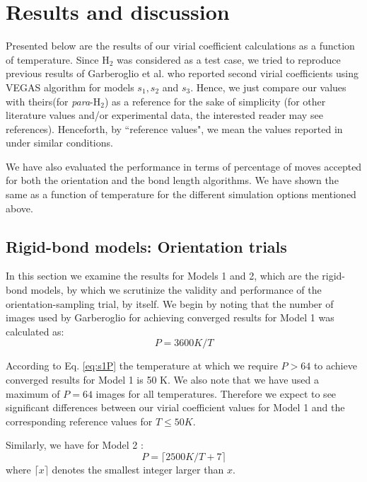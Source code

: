     \section{Results and discussion}
        Presented below are the results of our virial coefficient calculations as a function of temperature. Since H$_2$ was considered as a test case, we tried to reproduce previous results of Garberoglio et al.\cite{Garberoglio2014} who reported second virial coefficients using VEGAS\cite{Lepage1972} algorithm for models $s_1, s_2$ and $s_3$. Hence, we just compare our values with theirs(for \emph{para}-H$_2$) as a reference for the sake of simplicity (for other literature values and/or experimental data, the interested reader may see references\cite{Goodwin1963, Patkowski2008, Leachman2009, Sakoda2012, Garberoglio2012, Garberoglio2014}). Henceforth, by ``reference values", we mean the values reported in \cite{Garberoglio2014} under similar conditions.

        We have also evaluated the performance in terms of percentage of moves accepted for both the orientation and the bond length algorithms. We have shown the same as a function of temperature for the different simulation options mentioned above.

        \subsection{Rigid-bond models: Orientation trials}
            In this section we examine the results for Models 1 and 2, which are the rigid-bond models, by which we scrutinize the validity and performance of the orientation-sampling trial, by itself. We begin by noting that the number of images used by Garberoglio for achieving converged results \cite{Patkowski2008} for Model 1 was calculated as:
            \begin{equation}
            \label{eq:s1P}
                P = 3600 K/T
            \end{equation}

            According to Eq. \eqref{eq:s1P} the temperature at which we require $P > 64$ to achieve converged results for Model 1 is 50 K. We also note that we have used a maximum of $P = 64$ images for all temperatures. Therefore we expect to see significant differences between our virial coefficient values for Model 1 and the corresponding reference values for $T \le 50 K$.

            Similarly, we have for Model 2 \cite{Garberoglio2012}:
            \begin{equation}
            \label{eq:s2P}
                P = \lceil 2500 K/T + 7 \rceil
            \end{equation}
            where $\lceil x \rceil$ denotes the smallest integer larger than $x$.

